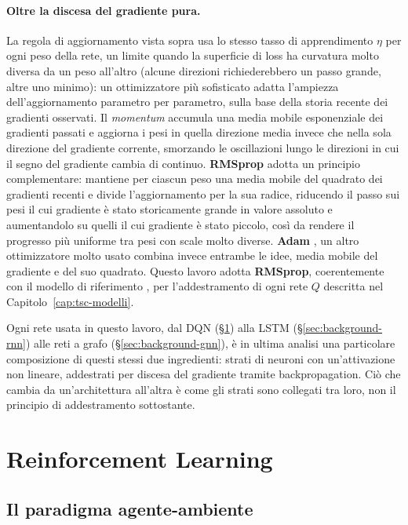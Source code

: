 \paragraph{Oltre la discesa del gradiente pura.} La regola di
aggiornamento vista sopra usa lo stesso tasso di apprendimento $\eta$ per
ogni peso della rete, un limite quando la superficie di loss ha curvatura
molto diversa da un peso all'altro (alcune direzioni richiederebbero un
passo grande, altre uno minimo): un ottimizzatore più sofisticato adatta
l'ampiezza dell'aggiornamento parametro per parametro, sulla base della
storia recente dei gradienti osservati. Il \emph{momentum} accumula una
media mobile esponenziale dei gradienti passati e aggiorna i pesi in quella
direzione media invece che nella sola direzione del gradiente corrente,
smorzando le oscillazioni lungo le direzioni in cui il segno del gradiente
cambia di continuo. \textbf{RMSprop} \citep{tieleman2012rmsprop} adotta un
principio complementare: mantiene per ciascun peso una media mobile del
quadrato dei gradienti recenti e divide l'aggiornamento per la sua radice,
riducendo il passo sui pesi il cui gradiente è stato storicamente grande in
valore assoluto e aumentandolo su quelli il cui gradiente è stato piccolo,
così da rendere il progresso più uniforme tra pesi con scale molto diverse.
\textbf{Adam} \citep{kingma2015adam}, un altro ottimizzatore molto usato combina invece entrambe le idee, media mobile
del gradiente e del suo quadrato. Questo lavoro
adotta \textbf{RMSprop}, coerentemente con il modello di riferimento
\citep{wang2022metastgat}, per l'addestramento di ogni rete $Q$ descritta
nel Capitolo~\ref{cap:tsc-modelli}.

Ogni rete usata in questo lavoro, dal DQN (§\ref{sec:background-rl}) alla
LSTM (§\ref{sec:background-rnn}) alle reti a grafo
(§\ref{sec:background-gnn}), è in ultima analisi una particolare
composizione di questi stessi due ingredienti: strati di neuroni con
un'attivazione non lineare, addestrati per discesa del gradiente tramite
backpropagation. Ciò che cambia da un'architettura all'altra è come gli
strati sono collegati tra loro, non il principio di addestramento
sottostante.

\section{Reinforcement Learning}
\label{sec:background-rl}

\subsection{Il paradigma agente-ambiente}

